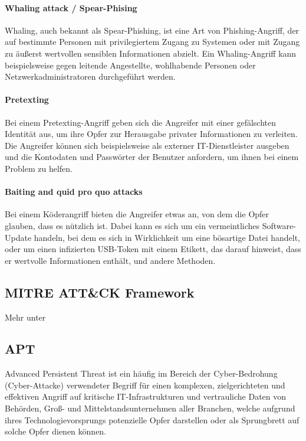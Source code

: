 \paragraph{Whaling attack / Spear-Phising}
Whaling, auch bekannt als Spear-Phishing, ist eine Art von Phishing-Angriff, der auf bestimmte Personen mit privilegiertem Zugang zu Systemen oder mit Zugang zu äußerst wertvollen sensiblen Informationen abzielt. Ein Whaling-Angriff kann beispielsweise gegen leitende Angestellte, wohlhabende Personen oder Netzwerkadministratoren durchgeführt werden.

\paragraph{Pretexting}
Bei einem Pretexting-Angriff geben sich die Angreifer mit einer gefälschten Identität aus, um ihre Opfer zur Herausgabe privater Informationen zu verleiten. Die Angreifer können sich beispielsweise als externer IT-Dienstleister ausgeben und die Kontodaten und Passwörter der Benutzer anfordern, um ihnen bei einem Problem zu helfen.

\paragraph{Baiting and quid pro quo attacks}
Bei einem Köderangriff bieten die Angreifer etwas an, von dem die Opfer glauben, dass es nützlich ist. Dabei kann es sich um ein vermeintliches Software-Update handeln, bei dem es sich in Wirklichkeit um eine bösartige Datei handelt, oder um einen infizierten USB-Token mit einem Etikett, das darauf hinweist, dass er wertvolle Informationen enthält, und andere Methoden.


\subsection{MITRE ATT\&CK Framework}
Mehr unter %

\subsection{APT}
Advanced Persistent Threat ist ein häufig im Bereich der Cyber-Bedrohung (Cyber-Attacke) verwendeter Begriff für einen komplexen, zielgerichteten und effektiven Angriff auf kritische IT-Infrastrukturen und vertrauliche Daten von Behörden, Groß- und Mittelstandsunternehmen aller Branchen, welche aufgrund ihres Technologievorsprungs potenzielle Opfer darstellen oder als Sprungbrett auf solche Opfer dienen können.

